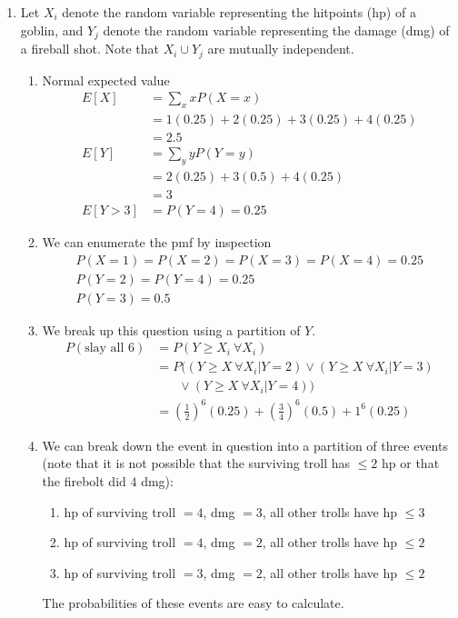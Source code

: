\documentclass{article}
\begin{document}
\begin{enumerate}
		\clearpage
		\item
		Let $X_i$ denote the random variable representing the hitpoints (hp) of a goblin, and $Y_j$ denote the random variable representing the damage (dmg) of a fireball shot. Note that $X_i\cup Y_j$ are mutually independent.
		
		\begin{enumerate}
			\item Normal expected value
			\begin{align*}
				E[X]&=\sum_{x} xP(X=x)\\
				&=1(0.25)+2(0.25)+3(0.25)+4(0.25)\\
				&=2.5\\
				E[Y]&=\sum_{y}yP(Y=y)\\
				&=2(0.25)+3(0.5)+4(0.25)\\
				&=3\\
				E[Y>3]&=P(Y=4)=0.25
			\end{align*}
			
			\item We can enumerate the pmf by inspection
			\begin{gather*}
				P(X=1)=P(X=2)=P(X=3)=P(X=4)=0.25\\
				P(Y=2)=P(Y=4)=0.25\\
				P(Y=3)=0.5
			\end{gather*}
			
			\item 
			We break up this question using a partition of $Y$.
			\begin{align*}
				P(\text{slay all 6})&=P(Y\ge X_i\ \forall X_i)\\
				&=P((Y\ge X\ \forall X_i|Y=2)\lor (Y\ge X\ \forall X_i|Y=3)\\
				&\ \ \ \ \ \ \ \ \lor (Y\ge X\ \forall X_i|Y=4))\\
				&=\left(\frac{1}{2}\right)^6(0.25)+\left(\frac{3}{4}\right)^6(0.5)+1^6(0.25)
			\end{align*}
			
			\clearpage
			\item
			We can break down the event in question into a partition of three events (note that it is not possible that the surviving troll has $\le 2$ hp or that the firebolt did $4$ dmg):
			\begin{enumerate}
				\item hp of surviving troll $=4$, dmg $=3$, all other trolls have hp $\le 3$
				\item hp of surviving troll $=4$, dmg $=2$, all other trolls have hp $\le 2$
				\item hp of surviving troll $=3$, dmg $=2$, all other trolls have hp $\le 2$
			\end{enumerate}
			The probabilities of these events are easy to calculate.
			

\end{enumerate}
\end{enumerate}
\end{document}
